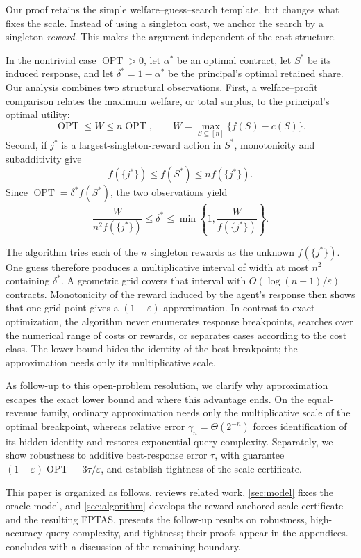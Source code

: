 \documentclass[11pt]{article}
\newcommand{\OPT}{\operatorname{OPT}}
\newcommand{\eps}{\varepsilon}
\begin{document}
Our proof retains the simple welfare--guess--search template, but changes
what fixes the scale.  Instead of using a singleton cost, we anchor the
search by a singleton \emph{reward}.  This makes the argument independent
of the cost structure.

In the nontrivial case $\OPT>0$, let $\alpha^*$ be an optimal contract, let
$S^*$ be its induced response, and let $\delta^*=1-\alpha^*$ be the
principal's optimal retained share.  Our analysis
combines two structural observations.
First, a welfare--profit comparison relates the maximum welfare, or total
surplus, to the principal's optimal utility:
\[
       \OPT\leq W\leq n\OPT,
       \qquad W=\max_{S\subseteq[n]}\{f(S)-c(S)\}.
\]
Second, if $j^*$ is a largest-singleton-reward action in $S^*$, monotonicity
and subadditivity give
\[
       f(\{j^*\})\leq f(S^*)\leq nf(\{j^*\}).
\]
Since $\OPT=\delta^*f(S^*)$, the two observations yield
\[
 \frac{W}{n^2f(\{j^*\})}
       \leq \delta^*
       \leq \min\!\left\{1,\frac{W}{f(\{j^*\})}\right\}.   \tag{1}
\]

The algorithm tries each of the $n$ singleton rewards as the unknown
$f(\{j^*\})$.  One guess therefore produces a multiplicative interval of
width at most $n^2$ containing $\delta^*$.  A geometric grid covers that
interval with $O(\log(n+1)/\eps)$ contracts.  Monotonicity of the reward
induced by the agent's response then shows that one grid point gives a
$(1-\eps)$-approximation.  In contrast to exact optimization, the algorithm
never enumerates response breakpoints, searches over the numerical range of
costs or rewards, or separates cases according to the cost class.  The
lower bound hides the identity of the best breakpoint; the approximation
needs only its multiplicative scale.

As follow-up to this open-problem resolution, we clarify why approximation
escapes the exact lower bound and where this advantage ends.  On the
equal-revenue family, ordinary approximation needs only the
multiplicative scale of the optimal breakpoint, whereas relative error
$\gamma_n=\Theta(2^{-n})$ forces identification of its hidden identity and
restores exponential query complexity.  Separately, we show robustness to
additive best-response error $\tau$, with guarantee
$(1-\eps)\OPT-3\tau/\eps$, and establish tightness of the scale certificate.

This paper is organized as follows.   reviews related work,
\cref{sec:model} fixes the oracle model, and \cref{sec:algorithm} develops the
reward-anchored scale certificate and the resulting FPTAS\@.
 presents the follow-up results on robustness,
high-accuracy query complexity, and tightness; their proofs appear in the
appendices.   concludes with a discussion of the
remaining boundary.
\end{document}
